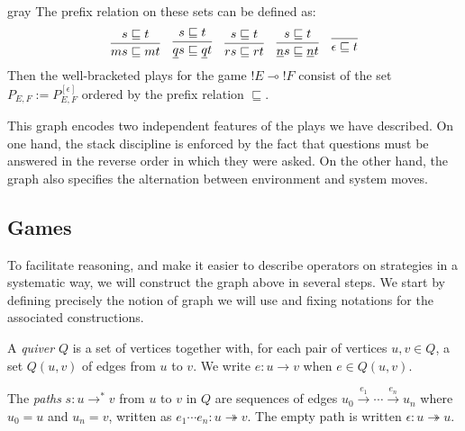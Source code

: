 \documentclass[format=sigplan,authordraft]{acmart}
\begin{document}
\begin{color}{gray}
The prefix relation on these sets
can be defined as:
\[
  \begin{prooftree}
    \hypo{s \sqsubseteq t}
    \infer1{ms \sqsubseteq mt}
  \end{prooftree}
  \quad
  \begin{prooftree}
    \hypo{s \sqsubseteq t}
    \infer1{\underline{q} s \sqsubseteq \underline{q} t}
  \end{prooftree}
  \quad
  \begin{prooftree}
    \hypo{s \sqsubseteq t}
    \infer1{rs \sqsubseteq rt}
  \end{prooftree}
  \quad
  \begin{prooftree}
    \hypo{s \sqsubseteq t}
    \infer1{\underline{n} s \sqsubseteq \underline{n} t}
  \end{prooftree}
  \quad
  \begin{prooftree}
    \infer0{\epsilon \sqsubseteq t}
  \end{prooftree}
\]
Then the well-bracketed plays
for the game ${!E} \multimap {!F}$
consist of the set $P_{E,F} := P_{E,F}^{[\epsilon]}$
ordered by the prefix relation $\sqsubseteq$.
\end{color}

This graph encodes two independent features of
the plays we have described.
On one hand,
the stack discipline is enforced by the fact that
questions must be answered in the reverse order
in which they were asked.
On the other hand,
the graph also specifies the alternation between
environment and system moves.


\subsection{Games} %

To facilitate reasoning,
and make it easier to describe operators on strategies
in a systematic way,
we will construct the graph above in several steps.
We start by defining precisely the notion of graph we will use
and fixing notations for the associated constructions.

\begin{definition}
A \emph{quiver} $Q$ is a set of vertices together with,
for each pair of vertices $u, v \in Q$,
a set $Q(u,v)$ of edges from $u$ to $v$.
We write $e : u \rightarrow v$ when $e \in Q(u, v)$.

The \emph{paths} $s : u \rightarrow^* v$
from $u$ to $v$ in $Q$ are
sequences of edges
$u_0 \xrightarrow{e_1} \cdots \xrightarrow{e_n} u_n$
where $u_0 = u$ and $u_n = v$,
written as $e_1 \cdots e_n : u \twoheadrightarrow v$.
The empty path is written $\epsilon : u \twoheadrightarrow u$.
\end{definition}
\end{document}
